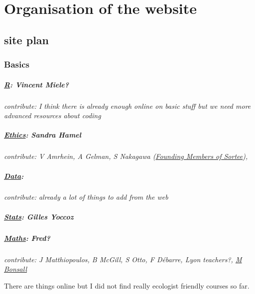 \documentclass[
]{article}
\begin{document}
\hypertarget{organisation-of-the-website}{%
\section{Organisation of the
website}\label{organisation-of-the-website}}

\hypertarget{site-plan}{%
\subsection{site plan}\label{site-plan}}

\hypertarget{basics}{%
\subsubsection{Basics}\label{basics}}

\hypertarget{r-vincent-miele}{%
\subparagraph{\texorpdfstring{\href{basics_r.html}{R}: Vincent
Miele?}{R: Vincent Miele?}}\label{r-vincent-miele}}

\emph{contribute: I think there is already enough online on basic stuff
but we need more advanced resources about coding}

\hypertarget{ethics-sandra-hamel}{%
\subparagraph{\texorpdfstring{\href{basics_ethics.html}{Ethics}:
\textbf{Sandra
Hamel}}{Ethics: Sandra Hamel}}\label{ethics-sandra-hamel}}

\emph{contribute: V Amrhein, A Gelman, S Nakagawa
(\href{https://www.sortee.org/people/}{Founding Members of Sortee}), }

\hypertarget{data}{%
\subparagraph{\texorpdfstring{\href{basics_data.html}{Data}:}{Data:}}\label{data}}

\emph{contribute: already a lot of things to add from the web}

\hypertarget{stats-gilles-yoccoz}{%
\subparagraph{\texorpdfstring{\href{basics_stats.html}{Stats}:
\textbf{Gilles
Yoccoz}}{Stats: Gilles Yoccoz}}\label{stats-gilles-yoccoz}}

\hypertarget{maths-fred}{%
\subparagraph{\texorpdfstring{\href{basics_maths.html}{Maths}:
Fred?}{Maths: Fred?}}\label{maths-fred}}

\emph{contribute: J Matthiopoulos, B McGill, S Otto, F Débarre, Lyon
teachers?,
\href{https://www.zoo.ox.ac.uk/people/professor-michael-bonsall?filter_types-1860401\%5B\%5D=\&filter_series-1860401\%5B\%5D=\#tab-1860396}{M
Bonsall}}

There are things online but I did not find really ecologist friendly
courses so far.
\end{document}

